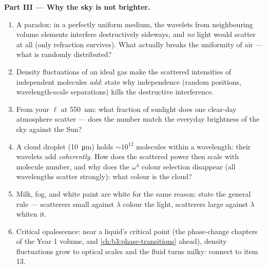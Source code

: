 \begin{problem}
\medskip\noindent\textbf{Part III --- Why the sky is not
brighter.}
\begin{enumerate}[resume]
  \item A paradox: in a perfectly uniform medium, the wavelets
        from neighbouring volume elements interfere destructively
        sideways, and \emph{no} light would scatter at all (only
        refraction survives). What actually breaks the uniformity
        of air --- what is randomly distributed?
  \item Density fluctuations of an ideal gas make the scattered
        intensities of independent molecules \emph{add}: state
        why independence (random positions, wavelength-scale
        separations) kills the destructive interference.
  \item From your $\ell$ at \qty{550}{nm}: what fraction of
        sunlight does one clear-day atmosphere scatter --- does
        the number match the everyday brightness of the sky
        against the Sun?
  \item A cloud droplet (\qty{10}{\micro m}) holds $\sim10^{12}$
        molecules within a wavelength: their wavelets add
        \emph{coherently}. How does the scattered power then
        scale with molecule number, and why does the $\omega^4$
        colour selection disappear (all wavelengths scatter
        strongly): what colour is the cloud?
  \item Milk, fog, and white paint are white for the same
        reason: state the general rule --- scatterers small
        against $\lambda$ colour the light, scatterers large
        against $\lambda$ whiten it.
  \item Critical opalescence: near a liquid's critical point
        (the phase-change chapters of the Year 1 volume, and
        \cref{ch:b3:phase-transitions} ahead), density fluctuations grow to optical scales and
        the fluid turns milky: connect to item 13.
\end{enumerate}


\end{problem}
